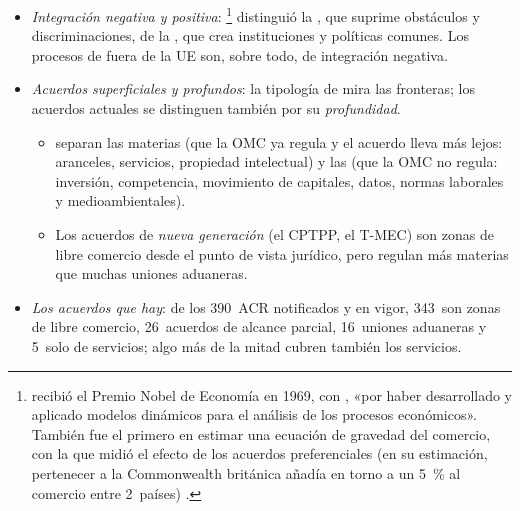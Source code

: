 \documentclass[11pt]{article}
\begin{document}
\begin{infografia}[H]
\centering
\caption{Zona de libre comercio y desviación del tráfico (izquierda) frente a unión aduanera con arancel exterior común (derecha)}\label{figu:zlc-ua}
\end{infografia}

\begin{itemize}
\item \emph{Integración negativa y positiva}: \textcite{Tinbergen1954International}\footnote{ recibió el Premio Nobel de Economía en 1969, con , «por haber desarrollado y aplicado modelos dinámicos para el análisis de los procesos económicos»\nocite{Nobel1969}. También fue el primero en estimar una ecuación de gravedad del comercio, con la que midió el efecto de los acuerdos preferenciales (en su estimación, pertenecer a la Commonwealth británica añadía en torno a un 5~\% al comercio entre 2~países) .} distinguió la , que suprime obstáculos y discriminaciones, de la , que crea instituciones y políticas comunes. Los procesos de fuera de la UE son, sobre todo, de integración negativa.
\item \emph{Acuerdos superficiales y profundos}: la tipología de  mira las fronteras; los acuerdos actuales se distinguen también por su \emph{profundidad}.
  \begin{itemize}
  \item \textcite{HornMavroidisSapir2010} separan las materias  (que la OMC ya regula y el acuerdo lleva más lejos: aranceles, servicios, propiedad intelectual) y las  (que la OMC no regula: inversión, competencia, movimiento de capitales, datos, normas laborales y medioambientales).
  \item Los acuerdos de \emph{nueva generación} (el CPTPP, el T-MEC) son zonas de libre comercio desde el punto de vista jurídico, pero regulan más materias que muchas uniones aduaneras.
  \end{itemize}
\item \emph{Los acuerdos que hay}: de los 390~ACR notificados y en vigor, 343~son zonas de libre comercio, 26~acuerdos de alcance parcial, 16~uniones aduaneras y 5~solo de servicios; algo más de la mitad cubren también los servicios\nocite{OMC2026RTAIS}.
\end{itemize}
\end{document}
